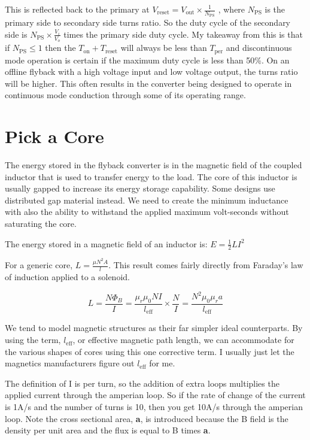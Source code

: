 \documentclass{article}
\begin{document}
This is reflected back to the primary at 
$V_{\text{reset}} = V_{\text{out}} \times \frac{1}{N_{\text{PS}}}$
, where $N_{\text{PS}}$ is the primary side to secondary side turns ratio.  So the duty 
cycle of the secondary side is
$N_{\text{PS}} \times \frac{V_i}{V_o}$
times the primary side duty cycle.  My takeaway from this is that if 
$N_{\text{PS}} \leq 1$
then the $T_{\text{on}} + T_{\text{reset}}$
will always be less than $T_{\text{per}}$ 
and discontinuous mode operation is certain if the maximum duty cycle is less than 50\%.  On an offline flyback with a high
voltage input and low voltage output, the turns ratio will be higher.  This often
results in the converter being designed to operate in continuous mode conduction
through some of its operating range.

\section{Pick a Core}

The energy stored in the flyback converter is in the magnetic field of the coupled
inductor that is used to transfer energy to the load.  The core of this inductor
is usually gapped to increase its energy storage capability.  Some designs use
distributed gap material instead.  We need to create the minimum inductance with
also the ability to withstand the applied maximum volt-seconds without saturating
the core.

The energy stored in a magnetic field of an inductor is:
$E = \frac{1}{2} LI^2$

For a generic core, $L = \frac{\mu N^2 A}{l}$.  This result comes fairly directly
from Faraday’s law of induction applied to a solenoid.

\begin{equation}
    L = \frac{N \Phi_B}{I} = \frac{\mu_r \mu_0 N I}{l_{\text{eff}}} \times \frac{N}{I} = \frac{N^2 \mu_0 \mu_r a}{l_{\text{eff}}}
    \label{eq:inductance5}
\end{equation}

We tend to model magnetic structures as their far simpler ideal counterparts.
By using the term, $l_{\text{eff}}$, or effective magnetic path length, we can
accommodate for the various shapes of cores using this one corrective term.
I usually just let the magnetics manufacturers figure out $l_{\text{eff}}$ for me.

The definition of I is per turn, so the addition of extra loops multiplies the
applied current through the amperian loop.  So if the rate of change of the current
is 1A/s and the number of turns is 10, then you get 10A/s through the amperian loop.
Note the cross sectional area, \textbf{a}, is introduced because the B field is the density
per unit area and the flux is equal to B times \textbf{a}.
\end{document}
